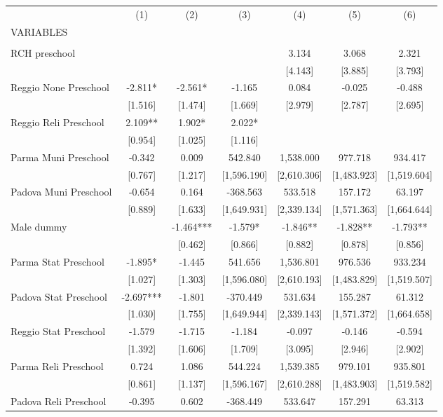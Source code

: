 \begin{tabular}{lcccccc} \hline
 & (1) & (2) & (3) & (4) & (5) & (6) \\
VARIABLES &  &  &  &  &  &  \\ \hline
 &  &  &  &  &  &  \\
RCH preschool &  &  &  & 3.134 & 3.068 & 2.321 \\
 &  &  &  & [4.143] & [3.885] & [3.793] \\
Reggio None Preschool & -2.811* & -2.561* & -1.165 & 0.084 & -0.025 & -0.488 \\
 & [1.516] & [1.474] & [1.669] & [2.979] & [2.787] & [2.695] \\
Reggio Reli Preschool & 2.109** & 1.902* & 2.022* &  &  &  \\
 & [0.954] & [1.025] & [1.116] &  &  &  \\
Parma Muni Preschool & -0.342 & 0.009 & 542.840 & 1,538.000 & 977.718 & 934.417 \\
 & [0.767] & [1.217] & [1,596.190] & [2,610.306] & [1,483.923] & [1,519.604] \\
Padova Muni Preschool & -0.654 & 0.164 & -368.563 & 533.518 & 157.172 & 63.197 \\
 & [0.889] & [1.633] & [1,649.931] & [2,339.134] & [1,571.363] & [1,664.644] \\
Male dummy &  & -1.464*** & -1.579* & -1.846** & -1.828** & -1.793** \\
 &  & [0.462] & [0.866] & [0.882] & [0.878] & [0.856] \\
Parma Stat Preschool & -1.895* & -1.445 & 541.656 & 1,536.801 & 976.536 & 933.234 \\
 & [1.027] & [1.303] & [1,596.080] & [2,610.193] & [1,483.829] & [1,519.507] \\
Padova Stat Preschool & -2.697*** & -1.801 & -370.449 & 531.634 & 155.287 & 61.312 \\
 & [1.030] & [1.755] & [1,649.944] & [2,339.143] & [1,571.372] & [1,664.658] \\
Reggio Stat Preschool & -1.579 & -1.715 & -1.184 & -0.097 & -0.146 & -0.594 \\
 & [1.392] & [1.606] & [1.709] & [3.095] & [2.946] & [2.902] \\
Parma Reli Preschool & 0.724 & 1.086 & 544.224 & 1,539.385 & 979.101 & 935.801 \\
 & [0.861] & [1.137] & [1,596.167] & [2,610.288] & [1,483.903] & [1,519.582] \\
Padova Reli Preschool & -0.395 & 0.602 & -368.449 & 533.647 & 157.291 & 63.313 \\

\end{tabular}
